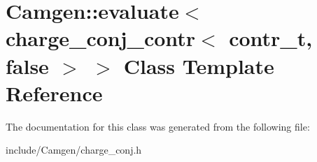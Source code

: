 \hypertarget{a00144}{}\section{Camgen\+:\+:evaluate$<$ charge\+\_\+conj\+\_\+contr$<$ contr\+\_\+t, false $>$ $>$ Class Template Reference}
\label{a00144}


The documentation for this class was generated from the following file\+:\begin{DoxyCompactItemize}
\item 
include/\+Camgen/charge\+\_\+conj.\+h\end{DoxyCompactItemize}
